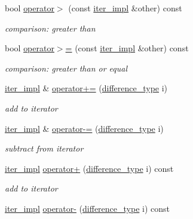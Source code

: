 \begin{DoxyCompactItemize}
bool \hyperlink{classnlohmann_1_1detail_1_1iter__impl_aaf3620b8dfa4bed8a9ac2b51dd55dbd7}{operator$>$} (const \hyperlink{classnlohmann_1_1detail_1_1iter__impl}{iter\+\_\+impl} \&other) const
\begin{DoxyCompactList}\small\item\em comparison\+: greater than \end{DoxyCompactList}\item 
bool \hyperlink{classnlohmann_1_1detail_1_1iter__impl_a634f85da575cb60b012a687efa26e11a}{operator$>$=} (const \hyperlink{classnlohmann_1_1detail_1_1iter__impl}{iter\+\_\+impl} \&other) const
\begin{DoxyCompactList}\small\item\em comparison\+: greater than or equal \end{DoxyCompactList}\item 
\hyperlink{classnlohmann_1_1detail_1_1iter__impl}{iter\+\_\+impl} \& \hyperlink{classnlohmann_1_1detail_1_1iter__impl_a3eef94f9d167046e7f773aeb6b78090c}{operator+=} (\hyperlink{classnlohmann_1_1detail_1_1iter__impl_a2f7ea9f7022850809c60fc3263775840}{difference\+\_\+type} i)
\begin{DoxyCompactList}\small\item\em add to iterator \end{DoxyCompactList}\item 
\hyperlink{classnlohmann_1_1detail_1_1iter__impl}{iter\+\_\+impl} \& \hyperlink{classnlohmann_1_1detail_1_1iter__impl_abcc9d51bc52f2e8483bbe4018f05e978}{operator-\/=} (\hyperlink{classnlohmann_1_1detail_1_1iter__impl_a2f7ea9f7022850809c60fc3263775840}{difference\+\_\+type} i)
\begin{DoxyCompactList}\small\item\em subtract from iterator \end{DoxyCompactList}\item 
\hyperlink{classnlohmann_1_1detail_1_1iter__impl}{iter\+\_\+impl} \hyperlink{classnlohmann_1_1detail_1_1iter__impl_a8ef76aeb5a5032768f0f61f48ac189c0}{operator+} (\hyperlink{classnlohmann_1_1detail_1_1iter__impl_a2f7ea9f7022850809c60fc3263775840}{difference\+\_\+type} i) const
\begin{DoxyCompactList}\small\item\em add to iterator \end{DoxyCompactList}\item 
\hyperlink{classnlohmann_1_1detail_1_1iter__impl}{iter\+\_\+impl} \hyperlink{classnlohmann_1_1detail_1_1iter__impl_a0dd9c415b94a02ff2aa25da75e52da30}{operator-\/} (\hyperlink{classnlohmann_1_1detail_1_1iter__impl_a2f7ea9f7022850809c60fc3263775840}{difference\+\_\+type} i) const

\end{DoxyCompactItemize}
